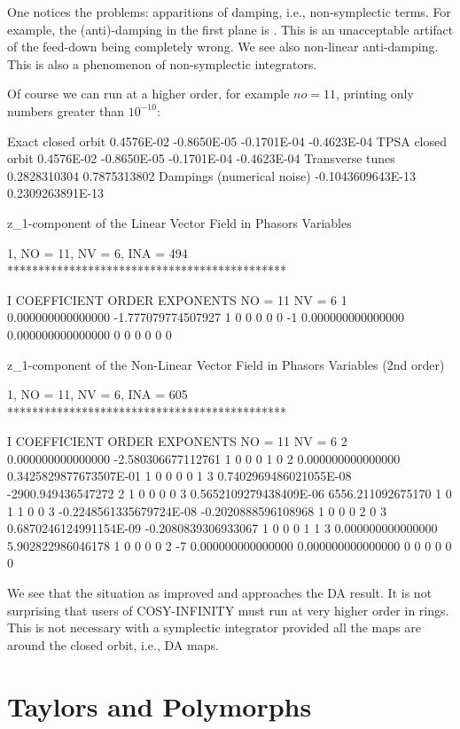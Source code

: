 \documentclass{hitec}     %
\newcommand{\Section}[1]{\section{#1}\vspace*{-1ex}}
\begin{document}
{{{{{{ 
 One notices the problems: apparitions of damping, i.e., non-symplectic terms. For example, the (anti)-damping in the first plane is . This is an unacceptable artifact of the feed-down being completely wrong. We see also non-linear anti-damping. This is also a phenomenon of non-symplectic integrators.
 
 
 Of course we can run at a higher order, for example $no=11$, printing only numbers greater than $10^{-10}$:
 
 \begin{code}
Exact closed orbit  0.4576E-02 -0.8650E-05 -0.1701E-04 -0.4623E-04
TPSA  closed orbit  0.4576E-02 -0.8650E-05 -0.1701E-04 -0.4623E-04
 Transverse tunes
  0.2828310304       0.7875313802
 Dampings (numerical noise)
 -0.1043609643E-13   0.2309263891E-13

 z_1-component of the Linear Vector Field in Phasors Variables

          1, NO =   11, NV =    6, INA =  494
 *********************************************

    I  COEFFICIENT          ORDER   EXPONENTS
      NO =    11      NV =     6
   1   0.000000000000000      -1.777079774507927       1  0  0  0  0  0
    -1   0.000000000000000       0.000000000000000       0  0  0  0  0  0

 z_1-component of the Non-Linear Vector Field in Phasors Variables (2nd order)

          1, NO =   11, NV =    6, INA =  605
 *********************************************

    I  COEFFICIENT          ORDER   EXPONENTS
      NO =    11      NV =     6
   2   0.000000000000000      -2.580306677112761       1  0  0  0  1  0
   2   0.000000000000000      0.3425829877673507E-01   1  0  0  0  0  1
   3  0.7402969486021055E-08  -2900.949436547272       2  1  0  0  0  0
   3  0.5652109279438409E-06   6556.211092675170       1  0  1  1  0  0
   3 -0.2248561335679724E-08 -0.2020888596108968       1  0  0  0  2  0
   3  0.6870246124991154E-09 -0.2080839306933067       1  0  0  0  1  1
   3   0.000000000000000       5.902822986046178       1  0  0  0  0  2
    -7   0.000000000000000       0.000000000000000       0  0  0  0  0  0
 \end{code}
  \renewcommand{\codefont}{\small}
  
 We see that the situation as improved and approaches the DA result.     It is not surprising that users of COSY-INFINITY must run at very higher order in rings. This is not necessary with a symplectic integrator provided all the maps are around the closed orbit, i.e., DA maps.
\Section{Taylors and Polymorphs}
\label{s:fundamental}
 
}}}}}}
\end{document}
